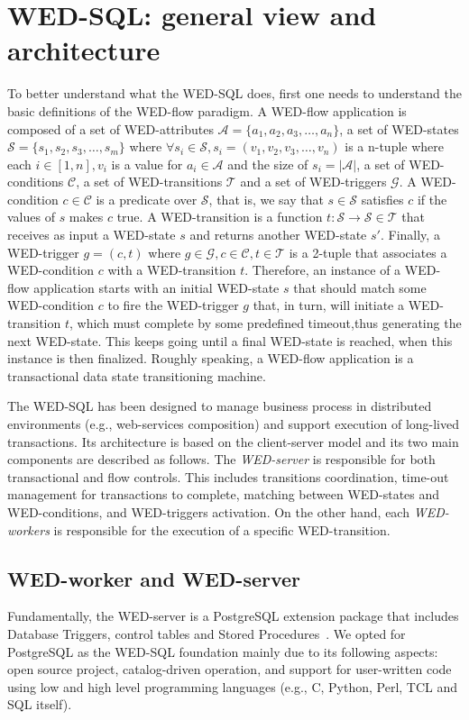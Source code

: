 \documentclass[12pt]{article}
\begin{document}
\section{WED-SQL: general view and architecture} 
\label{sec:arch}


To better understand what the WED-SQL does, first one needs to understand the basic definitions of the WED-flow paradigm. 
A WED-flow application is composed of a set of WED-attributes $\mathcal{A} = \{a_1,a_2,a_3,\ldots,a_n\}$, a set of WED-states
$\mathcal{S} = \{s_1,s_2,s_3,\ldots,s_m\}$ where $ \forall s_i \in \mathcal{S}, s_i = (v_1,v_2,v_3,\ldots,v_n)$
is a n-tuple where each $i\in[1,n], v_i$ is a value for $a_i \in \mathcal{A}$ and the size of $s_i = |\mathcal{A}|$, a set of
WED-conditions $\mathcal{C}$, a set of WED-transitions $\mathcal{T}$ and a set of WED-triggers $\mathcal{G}$. A WED-condition
$c \in \mathcal{C}$ is a predicate over $\mathcal{S}$, that is, we say that $s \in \mathcal{S}$ satisfies $c$ if the values
of $s$ makes $c$ true. A WED-transition is a function $t: \mathcal{S}\rightarrow\mathcal{S} \in \mathcal{T}$ that receives 
as input a WED-state $s$ and returns another WED-state $s'$. Finally, a WED-trigger $g = (c,t)$ where $g \in \mathcal{G},
c \in \mathcal{C}, t \in \mathcal{T}$ is a 2-tuple that associates a WED-condition $c$ with a WED-transition $t$. Therefore,
an instance of a WED-flow application starts with an initial WED-state $s$ that should match some WED-condition $c$ to fire
the WED-trigger $g$ that, in turn, will initiate a WED-transition $t$, which must complete by some predefined timeout,thus 
generating the next WED-state. This keeps going until a final WED-state is reached, when this instance is then finalized. 
Roughly speaking, a WED-flow application is a transactional data state transitioning machine.

The WED-SQL has been designed to manage business process in distributed environments (e.g., web-services composition) and support execution of long-lived transactions. Its architecture is based on the client-server model and its two main components are described as follows. The \emph{WED-server} is responsible for both transactional and flow controls. This includes transitions coordination, time-out management for transactions to complete, matching between WED-states and WED-conditions, and WED-triggers activation.  On the other hand, each \emph{WED-workers} is responsible for the execution of a
specific WED-transition. 

\subsection{WED-worker and WED-server}
Fundamentally, the WED-server is a PostgreSQL extension package that includes  Database Triggers, control tables and Stored Procedures~\cite{NAV}. We opted for PostgreSQL as the WED-SQL foundation mainly due to its following aspects: open source project, catalog-driven operation, and support for user-written code using low and high level programming languages (e.g., C, Python, Perl, TCL and SQL itself).
\end{document}
